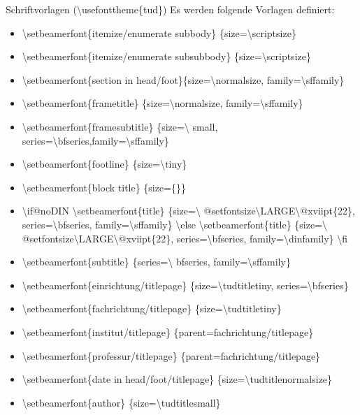 \documentclass[presentation,t]{beamer}
\begin{document}
\begin{frame}[allowframebreaks]{Schriftvorlagen (\textbackslash usefonttheme\{tud\})}
Es werden folgende Vorlagen definiert:
\begin{itemize}
\item \textbackslash setbeamerfont\{itemize/enumerate subbody\} \{size=\textbackslash scriptsize\}
\item \textbackslash setbeamerfont\{itemize/enumerate subsubbody\} \{size=\textbackslash scriptsize\}
\item \textbackslash setbeamerfont\{section in head/foot\}\{size=\textbackslash normalsize, family=\textbackslash sffamily\}
\item \textbackslash setbeamerfont\{frametitle\} \{size=\textbackslash normalsize, family=\textbackslash sffamily\}
\item \textbackslash setbeamerfont\{framesubtitle\} \{size=\textbackslash
   small, series=\textbackslash bfseries,family=\textbackslash sffamily\}
\item \textbackslash setbeamerfont\{footline\} \{size=\textbackslash tiny\}
\item \textbackslash setbeamerfont\{block title\} \{size=\{\}\}
\item \textbackslash if@noDIN
    \textbackslash setbeamerfont\{title\} \{size=\textbackslash
   @setfontsize\textbackslash LARGE\textbackslash @xviipt\{22\},
   series=\textbackslash bfseries, family=\textbackslash sffamily\}
  \textbackslash else
    \textbackslash setbeamerfont\{title\} \{size=\textbackslash
   @setfontsize\textbackslash LARGE\textbackslash @xviipt\{22\},
   series=\textbackslash bfseries, family=\textbackslash dinfamily\}
  \textbackslash fi
\item \textbackslash setbeamerfont\{subtitle\} \{series=\textbackslash
   bfseries, family=\textbackslash sffamily\}
\item \textbackslash setbeamerfont\{einrichtung/titlepage\}
   \{size=\textbackslash tudtitletiny, series=\textbackslash bfseries\}
\item \textbackslash setbeamerfont\{fachrichtung/titlepage\} \{size=\textbackslash tudtitletiny\}
\item \textbackslash setbeamerfont\{institut/titlepage\} \{parent=fachrichtung/titlepage\}
\item \textbackslash setbeamerfont\{professur/titlepage\} \{parent=fachrichtung/titlepage\}
\item \textbackslash setbeamerfont\{date in head/foot/titlepage\} \{size=\textbackslash tudtitlenormalsize\}
\item \textbackslash setbeamerfont\{author\} \{size=\textbackslash tudtitlesmall\}
\end{itemize}
\end{frame}
\end{document}
